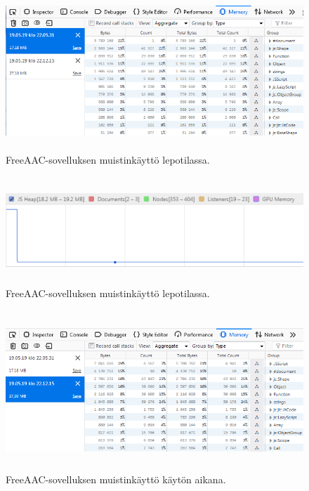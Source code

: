 \documentclass[utf8]{gradu3}
\begin{document}
\begin{figure}[h]\centering
  \includegraphics[height=6cm,keepaspectratio]{memory-use-idle}
  \caption[FreeAAC-sovelluksen muistinkäyttö lepotilassa.]
  {FreeAAC-sovelluksen muistinkäyttö lepotilassa.}
  \label{fig:memory-use-idle}
\end{figure}

\begin{figure}[h]\centering
  \includegraphics[height=4cm,keepaspectratio]{chromium-memory-use-idle}
  \caption[FreeAAC-sovelluksen muistinkäyttö lepotilassa graafina.]
  {FreeAAC-sovelluksen muistinkäyttö lepotilassa.}
  \label{fig:chromium-memory-use-idle}
\end{figure}

\begin{figure}[h]\centering
  \includegraphics[height=6cm,keepaspectratio]{memory-use-stress}
  \caption[FreeAAC-sovelluksen muistinkäyttö käytön aikana.]
  {FreeAAC-sovelluksen muistinkäyttö käytön aikana.}
  \label{fig:memory-use-stress}
\end{figure}
\end{document}
